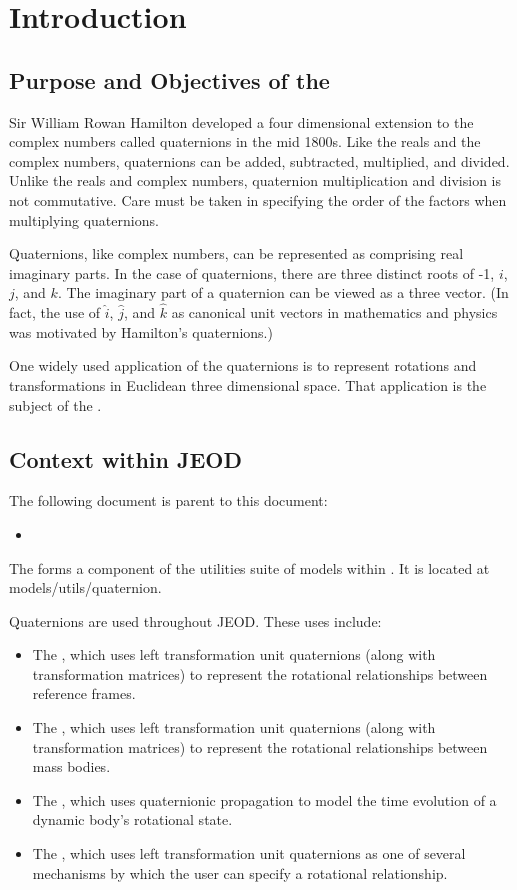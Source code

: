 \chapter{Introduction}
\label{ch:intro}

\section{Purpose and Objectives of the \ModelDesc}
\label{sec:purp}
Sir William Rowan Hamilton developed a four dimensional extension to the complex
numbers called quaternions in the mid 1800s. Like the reals and the complex
numbers, quaternions can be added, subtracted, multiplied, and divided.
Unlike the reals and complex numbers, quaternion multiplication and division
is not commutative. Care must be taken in specifying the order of the
factors when multiplying quaternions.

Quaternions, like complex numbers, can be represented as comprising real
imaginary parts. In the case of quaternions, there are three distinct roots
of -1, $i$, $j$, and $k$. The imaginary part of a quaternion can be viewed
as a three vector. (In fact, the use of $\hat i$, $\hat j$, and $\hat k$ as
canonical unit vectors in mathematics and physics was motivated by Hamilton's
quaternions.)

One widely used application of the quaternions is to represent rotations and
transformations in Euclidean three dimensional space.
That application is the subject of the \ModelDesc.

\section{Context within JEOD}
The following document is parent to this document:
\begin{itemize}
\item \hyperJEOD
\end{itemize}

The \ModelDesc forms a component of the utilities suite of
models within \JEODid. It is located at
models/utils/quaternion.





Quaternions are used throughout JEOD. These uses include:
\begin{itemize}
\item The ,
which uses left transformation unit quaternions
(along with transformation matrices) to represent the rotational
relationships between reference frames.
\item The ,
which uses left transformation unit quaternions
(along with transformation matrices) to represent the rotational
relationships between mass bodies.
\item The ,
which uses quaternionic propagation to
model the time evolution of a dynamic body's rotational state.
\item The ,
which uses left transformation unit quaternions
as one of several mechanisms by which the user can specify
a rotational relationship.
\end{itemize}


